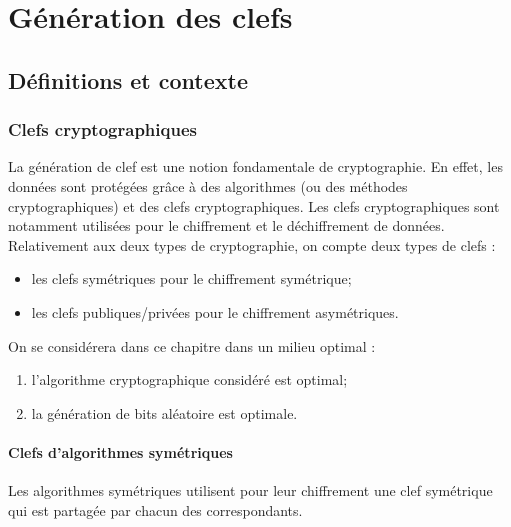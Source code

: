 \chapter{Génération des clefs}
\section{Définitions et contexte}

\subsection{Clefs cryptographiques}

La génération de clef est une notion fondamentale de cryptographie. En effet, les données sont protégées grâce à des algorithmes (ou des méthodes cryptographiques) et des clefs cryptographiques. Les clefs cryptographiques sont notamment utilisées pour le chiffrement et le déchiffrement de données. \\
Relativement aux deux types de cryptographie, on compte deux types de clefs : 
\begin{itemize}
\item les clefs symétriques pour le chiffrement symétrique;
\item les clefs publiques/privées pour le chiffrement asymétriques.\\
\end{itemize}

On se considérera dans ce chapitre dans un milieu optimal : 
\begin{enumerate}
\item l'algorithme cryptographique considéré est optimal;
\item la génération de bits aléatoire est optimale.
\end{enumerate}


\subsubsection{Clefs d'algorithmes symétriques}
Les algorithmes symétriques utilisent pour leur chiffrement une clef symétrique qui est partagée par chacun des correspondants. 

